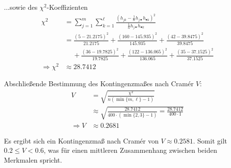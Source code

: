 ...sowie des $\chi^2$-Koeffizienten
\nopagebreak
$$
\begin{aligned}
    \chi^2 &= \sum_{j=1}^m \sum_{k=1}^\ell \frac{(h_{jk} - \frac1n h_{j\bullet} h_{\bullet k})^2}{\frac1n h_{j\bullet} h_{\bullet k}} \\
    &= \frac{(5-21.2175)^2}{21.2175} + \frac{(160-145.935)^2}{145.935} + \frac{(42-39.8475)^2}{39.8475} \\
    & \quad~ + \frac{(36-19.7825)^2}{19.7825} + \frac{(122-136.065)^2}{136.065} + \frac{(35-37.1525)^2}{37.1525} \\
    \Rightarrow \chi^2 &\approx 28.7412
\end{aligned}
$$

Abschließende Bestimmung des Kontingenzmaßes nach Cramér $V$:
\nopagebreak
$$
\begin{aligned}
    V &= \sqrt{\frac{\chi^2}{n (\min\lbrace m,\ell \rbrace - 1)}} \\
    &\approx \sqrt{\frac{28.7412}{400 \cdot (\min\lbrace2,3\rbrace - 1)} = \frac{28.7412}{400 \cdot 1}} \\
    \Rightarrow V &\approx 0.2681
\end{aligned}
$$

Es ergibt sich ein Kontingenzmaß nach Cramér von $V\approx0.2581$. Somit gilt $0.2\le V<0.6$, was für einen mittleren Zusammenhang zwischen beiden Merkmalen spricht.
